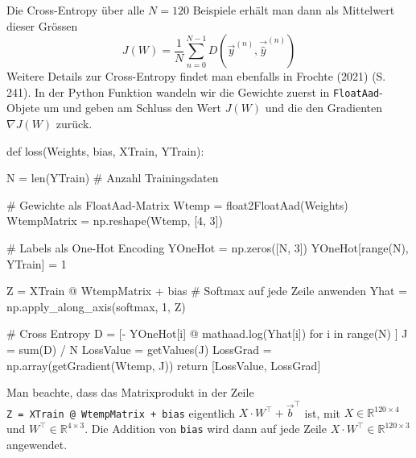 \documentclass[
  a4paper,
  DIV=11]{scrreprt}
\newenvironment{Shaded}{\begin{snugshade}}{\end{snugshade}}
\newcommand{\BuiltInTok}[1]{\textcolor[rgb]{0.00,0.23,0.31}{#1}}
\newcommand{\CommentTok}[1]{\textcolor[rgb]{0.37,0.37,0.37}{#1}}
\newcommand{\ControlFlowTok}[1]{\textcolor[rgb]{0.00,0.23,0.31}{#1}}
\newcommand{\DecValTok}[1]{\textcolor[rgb]{0.68,0.00,0.00}{#1}}
\newcommand{\KeywordTok}[1]{\textcolor[rgb]{0.00,0.23,0.31}{#1}}
\newcommand{\NormalTok}[1]{\textcolor[rgb]{0.00,0.23,0.31}{#1}}
\newcommand{\OperatorTok}[1]{\textcolor[rgb]{0.37,0.37,0.37}{#1}}
\theoremstyle{definition}
\theoremstyle{definition}
\theoremstyle{remark}
\begin{document}
Die Cross-Entropy über alle \(N=120\) Beispiele erhält man dann als
Mittelwert dieser Grössen \[
J(W) = \frac{1}{N}\sum_{n=0}^{N-1} D(\vec y^{(n)}, \vec{\hat y}^{(n)})
\] Weitere Details zur Cross-Entropy findet man ebenfalls in Frochte
(2021) (S. 241). In der Python Funktion wandeln wir die Gewichte zuerst
in \texttt{FloatAad}-Objete um und geben am Schluss den Wert \(J(W)\)
und die den Gradienten \(\nabla J (W)\) zurück.

\begin{Shaded}
\begin{Highlighting}[]
\KeywordTok{def}\NormalTok{ loss(Weights, bias, XTrain, YTrain):}
    
\NormalTok{    N }\OperatorTok{=} \BuiltInTok{len}\NormalTok{(YTrain) }\CommentTok{\# Anzahl Trainingsdaten}
    
    \CommentTok{\# Gewichte als FloatAad{-}Matrix}
\NormalTok{    Wtemp }\OperatorTok{=}\NormalTok{ float2FloatAad(Weights)}
\NormalTok{    WtempMatrix }\OperatorTok{=}\NormalTok{ np.reshape(Wtemp, [}\DecValTok{4}\NormalTok{, }\DecValTok{3}\NormalTok{])}
    
    
    \CommentTok{\# Labels als One{-}Hot Encoding}
\NormalTok{    YOneHot }\OperatorTok{=}\NormalTok{ np.zeros([N, }\DecValTok{3}\NormalTok{])}
\NormalTok{    YOneHot[}\BuiltInTok{range}\NormalTok{(N), YTrain] }\OperatorTok{=} \DecValTok{1}

\NormalTok{    Z }\OperatorTok{=}\NormalTok{ XTrain }\OperatorTok{@}\NormalTok{ WtempMatrix }\OperatorTok{+}\NormalTok{ bias}
    \CommentTok{\# Softmax auf jede Zeile anwenden}
\NormalTok{    Yhat }\OperatorTok{=}\NormalTok{ np.apply\_along\_axis(softmax, }\DecValTok{1}\NormalTok{, Z)}
    
    \CommentTok{\# Cross Entropy}
\NormalTok{    D }\OperatorTok{=}\NormalTok{ [}\OperatorTok{{-}}\NormalTok{ YOneHot[i] }\OperatorTok{@}\NormalTok{ mathaad.log(Yhat[i]) }\ControlFlowTok{for}\NormalTok{ i }\KeywordTok{in} \BuiltInTok{range}\NormalTok{(N) ]}
\NormalTok{    J }\OperatorTok{=} \BuiltInTok{sum}\NormalTok{(D) }\OperatorTok{/}\NormalTok{ N}
\NormalTok{    LossValue }\OperatorTok{=}\NormalTok{ getValues(J)}
\NormalTok{    LossGrad }\OperatorTok{=}\NormalTok{ np.array(getGradient(Wtemp, J))}
    \ControlFlowTok{return}\NormalTok{ [LossValue, LossGrad]}
\end{Highlighting}
\end{Shaded}

Man beachte, dass das Matrixprodukt in der Zeile
\texttt{Z\ =\ XTrain\ @\ WtempMatrix\ +\ bias} eigentlich
\(X\cdot W^\intercal + \vec b^\intercal\) ist, mit
\(X\in\mathbb{R}^{120\times 4}\) und
\(W^\intercal \in \mathbb{R}^{4\times 3}\). Die Addition von
\texttt{bias} wird dann auf jede Zeile
\(X\cdot W^\intercal \in \mathbb{R}^{120\times 3}\) angewendet.
\end{document}
